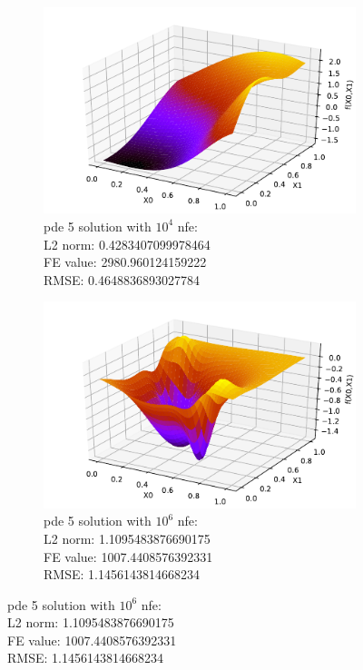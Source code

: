 \documentclass[./\jobname.tex]{subfiles}
\begin{document}
\begin{figure}[H]
	\centering
	\begin{subfigure}[b]{0.5\linewidth}
		\centering
		\includegraphics[width=1\textwidth]{../../code/experiments/experiment_0/pde5_best_sol_10_4.pdf}
		\caption{\gls{pde} 5 solution with $10^4$ \gls{nfe}: \\ L2 norm: 0.4283407099978464 \\ FE value: 2980.960124159222 \\ RMSE: 0.4648836893027784 }
		\label{fig:pde5_sol_10_4}
	\end{subfigure}%
	\begin{subfigure}[b]{0.5\linewidth}
		\centering
		\includegraphics[width=1\textwidth]{../../code/experiments/experiment_0/pde5_best_sol_10_6.pdf}
		\caption{\gls{pde} 5 solution with $10^6$ \gls{nfe}: \\ L2 norm: 1.1095483876690175 \\ FE value: 1007.4408576392331 \\ RMSE: 1.1456143814668234 }
		\label{fig:pde5_sol_10_6}
	\end{subfigure}%
	\label{fig:serial_jade_pde5_sol_comparison}
\end{figure}
\end{document}
